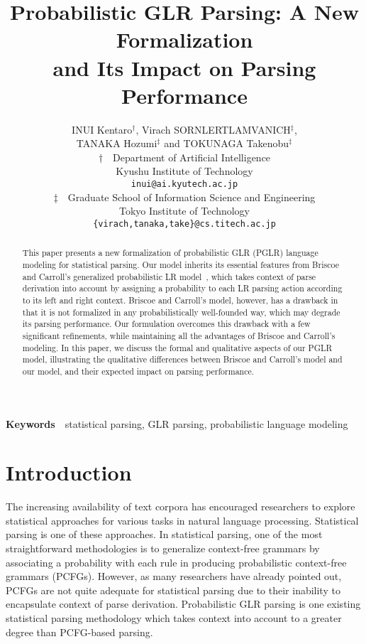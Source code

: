 \documentclass[a4j]{article}
\title{Probabilistic GLR Parsing: A New Formalization\\ and Its Impact on
  Parsing Performance}
\author{INUI Kentaro$^\dagger$, Virach SORNLERTLAMVANICH$^\ddagger$, \\
TANAKA Hozumi$^\ddagger$ and TOKUNAGA Takenobu$^\ddagger$\\
$\dagger$~~Department of Artificial Intelligence\\
  Kyushu Institute of Technology\\
{\tt inui@ai.kyutech.ac.jp}\\
$\ddagger$~~Graduate School of Information Science and Engineering\\
  Tokyo Institute of Technology\\
  {\tt \{virach,tanaka,take\}@cs.titech.ac.jp}}
\date{}
\begin{document}
\maketitle

\begin{abstract}
  This paper presents a new formalization of probabilistic GLR (PGLR)
  language modeling for statistical parsing. Our model inherits its
  essential features from Briscoe and Carroll's generalized
  probabilistic LR model~\cite{briscoe:93:a}, which takes context of
  parse derivation into account by assigning a probability to each LR
  parsing action according to its left and right context. Briscoe and
  Carroll's model, however, has a drawback in that it is not formalized
  in any probabilistically well-founded way, which may degrade its
  parsing performance. Our formulation overcomes this drawback with a
  few significant refinements, while maintaining all the advantages of
  Briscoe and Carroll's modeling. In this paper, we discuss the formal
  and qualitative aspects of our PGLR model, illustrating the
  qualitative differences between Briscoe and Carroll's model and our
  model, and their expected impact on parsing performance.
\end{abstract}

\noindent\textbf{Keywords}~~statistical parsing, GLR parsing, probabilistic language modeling

\section{Introduction}
\label{sec:intro}

The increasing availability of text corpora has encouraged researchers
to explore statistical approaches for various tasks in natural language
processing. Statistical parsing is one of these approaches. In
statistical parsing, one of the most straightforward methodologies is to
generalize context-free grammars by associating a probability with each
rule in producing probabilistic context-free grammars (PCFGs). However,
as many researchers have already pointed out, PCFGs are not quite
adequate for statistical parsing due to their inability to encapsulate
context of parse derivation. Probabilistic GLR parsing is one existing
statistical parsing methodology which takes context into account to a
greater degree than PCFG-based parsing.
\end{document}
